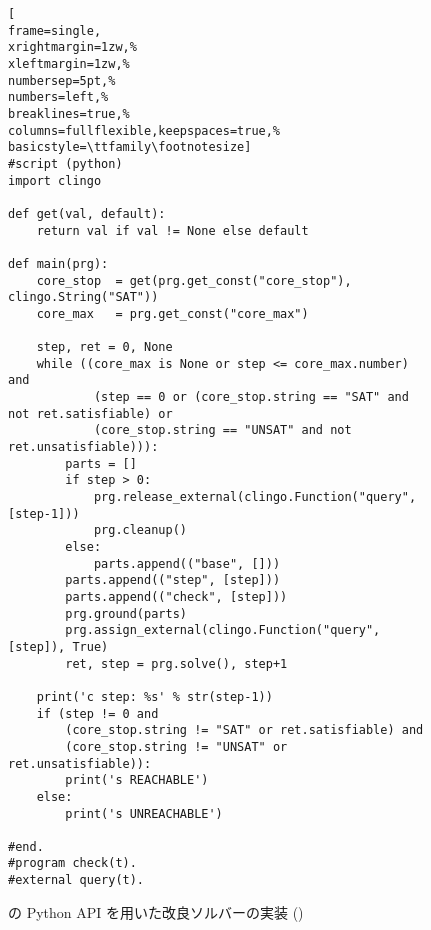 \begin{figure*}[t]
\centering  
\begin{lstlisting}[
frame=single,
xrightmargin=1zw,% 
xleftmargin=1zw,% 
numbersep=5pt,%
numbers=left,%
breaklines=true,%
columns=fullflexible,keepspaces=true,%
basicstyle=\ttfamily\footnotesize]
#script (python) 
import clingo

def get(val, default):
    return val if val != None else default

def main(prg):
    core_stop  = get(prg.get_const("core_stop"), clingo.String("SAT"))
    core_max   = prg.get_const("core_max")

    step, ret = 0, None
    while ((core_max is None or step <= core_max.number) and
            (step == 0 or (core_stop.string == "SAT" and not ret.satisfiable) or
            (core_stop.string == "UNSAT" and not ret.unsatisfiable))):    
        parts = []
        if step > 0:
            prg.release_external(clingo.Function("query", [step-1]))
            prg.cleanup()
        else:
            parts.append(("base", []))
        parts.append(("step", [step]))
        parts.append(("check", [step]))
        prg.ground(parts)
        prg.assign_external(clingo.Function("query", [step]), True)
        ret, step = prg.solve(), step+1

    print('c step: %s' % str(step-1))
    if (step != 0 and
        (core_stop.string != "SAT" or ret.satisfiable) and
        (core_stop.string != "UNSAT" or ret.unsatisfiable)):
        print('s REACHABLE')
    else:
        print('s UNREACHABLE')

#end.
#program check(t).
#external query(t).
\end{lstlisting}
\caption{{\clingo}の Python API を用いた改良ソルバーの実装 ()}
\label{code:core.lp}
\end{figure*}

